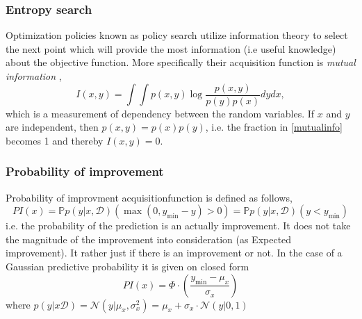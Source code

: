 \subsubsection{Entropy search}
Optimization policies known as policy search utilize information theory to select the next point
which will provide the most information (i.e useful knowledge) about the objective function. 
More specifically their acquisition function is \textit{mutual information} \cite[135-140]{bayesoptbook}, 
\begin{equation}\label{mutualinfo}
    I(x,y) = \int \int p(x,y) \log \frac{p(x,y)}{p(y)p(x)} dy dx,
\end{equation}
which is a measurement of dependency between the random variables. If $x$ and $y$ are independent, then
$p(x,y) = p(x)p(y)$, i.e. the fraction in \eqref{mutualinfo} becomes 1 and thereby $I(x,y) = 0$. 









\subsubsection{Probability of improvement}
Probability of improvment acquisitionfunction is defined as follows, 
$$PI(x) = \mathbb{P}{p(y|x,\mathcal{D})}(\max(0,y_{\min}-y)>0) =
\mathbb{P}{p(y|x,\mathcal{D})}(y<y_{\min})$$ i.e. the probability of the prediction is an actually
improvement. It does not take the magnitude of the improvement into consideration (as Expected
improvement). It rather just if there is an improvement or not. In the case of a Gaussian predictive
probability it is given on closed form
$$PI(x) = \Phi·\left(\frac{y_{\min}-\mu_x}{\sigma_x}\right)$$
where $p(y|x\mathcal{D}) =\mathcal{N}(y|\mu_x,\sigma_x^2) =\mu_x + \sigma_x\cdot\mathcal{N}(y|0,1)$

